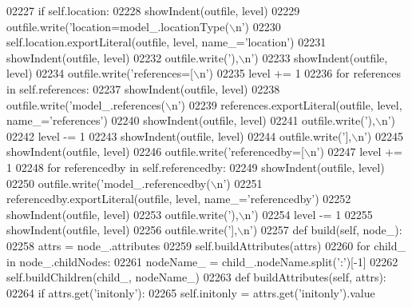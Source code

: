 \begin{DoxyCode}
{{{{{{{{{{{{{{{{{{{{{{{{{{{{{{{{{{{{{{{{{{{{{{{{{{{{{{{{{{{{{{{{{{{{{{{{{{{{{{{{{{{{{{{{{{{{{{{{{{{{{{{{{{{{{{{{{{{{{{{{{{{{{{{{{{{{{{{{{{{{{{{{{{{{{{{{{{{{{{{{{{{{{{{{{{02227         \textcolor{keywordflow}{if} self.location:
02228             showIndent(outfile, level)
02229             outfile.write(\textcolor{stringliteral}{'location=model\_.locationType(\(\backslash\)n'})
02230             self.location.exportLiteral(outfile, level, name\_=\textcolor{stringliteral}{'location'})
02231             showIndent(outfile, level)
02232             outfile.write(\textcolor{stringliteral}{'),\(\backslash\)n'})
02233         showIndent(outfile, level)
02234         outfile.write(\textcolor{stringliteral}{'references=[\(\backslash\)n'})
02235         level += 1
02236         \textcolor{keywordflow}{for} references \textcolor{keywordflow}{in} self.references:
02237             showIndent(outfile, level)
02238             outfile.write(\textcolor{stringliteral}{'model\_.references(\(\backslash\)n'})
02239             references.exportLiteral(outfile, level, name\_=\textcolor{stringliteral}{'references'})
02240             showIndent(outfile, level)
02241             outfile.write(\textcolor{stringliteral}{'),\(\backslash\)n'})
02242         level -= 1
02243         showIndent(outfile, level)
02244         outfile.write(\textcolor{stringliteral}{'],\(\backslash\)n'})
02245         showIndent(outfile, level)
02246         outfile.write(\textcolor{stringliteral}{'referencedby=[\(\backslash\)n'})
02247         level += 1
02248         \textcolor{keywordflow}{for} referencedby \textcolor{keywordflow}{in} self.referencedby:
02249             showIndent(outfile, level)
02250             outfile.write(\textcolor{stringliteral}{'model\_.referencedby(\(\backslash\)n'})
02251             referencedby.exportLiteral(outfile, level, name\_=\textcolor{stringliteral}{'referencedby'})
02252             showIndent(outfile, level)
02253             outfile.write(\textcolor{stringliteral}{'),\(\backslash\)n'})
02254         level -= 1
02255         showIndent(outfile, level)
02256         outfile.write(\textcolor{stringliteral}{'],\(\backslash\)n'})
02257     \textcolor{keyword}{def }build(self, node\_):
02258         attrs = node\_.attributes
02259         self.buildAttributes(attrs)
02260         \textcolor{keywordflow}{for} child\_ \textcolor{keywordflow}{in} node\_.childNodes:
02261             nodeName\_ = child\_.nodeName.split(\textcolor{stringliteral}{':'})[-1]
02262             self.buildChildren(child\_, nodeName\_)
02263     \textcolor{keyword}{def }buildAttributes(self, attrs):
02264         \textcolor{keywordflow}{if} attrs.get(\textcolor{stringliteral}{'initonly'}):
02265             self.initonly = attrs.get(\textcolor{stringliteral}{'initonly'}).value
}}}}}}}}}}}}}}}}}}}}}}}}}}}}}}}}}}}}}}}}}}}}}}}}}}}}}}}}}}}}}}}}}}}}}}}}}}}}}}}}}}}}}}}}}}}}}}}}}}}}}}}}}}}}}}}}}}}}}}}}}}}}}}}}}}}}}}}}}}}}}}}}}}}}}}}}}}}}}}}}}}}}}}}}}}
\end{DoxyCode}
